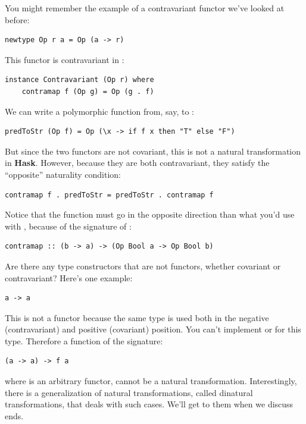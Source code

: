 You might remember the example of a contravariant functor we've looked
at before:

\begin{Verbatim}[commandchars=\\\{\}]
newtype Op r a = Op (a -> r)
\end{Verbatim}
This functor is contravariant in :

\begin{Verbatim}[commandchars=\\\{\}]
instance Contravariant (Op r) where
    contramap f (Op g) = Op (g . f)
\end{Verbatim}
We can write a polymorphic function from, say,  to
:

\begin{Verbatim}
predToStr (Op f) = Op (\x -> if f x then "T" else "F")
\end{Verbatim}
But since the two functors are not covariant, this is not a natural
transformation in \textbf{Hask}. However, because they are both
contravariant, they satisfy the ``opposite'' naturality condition:

\begin{Verbatim}[commandchars=\\\{\}]
contramap f . predToStr = predToStr . contramap f
\end{Verbatim}
Notice that the function  must go in the opposite direction
than what you'd use with , because of the signature of
:

\begin{Verbatim}[commandchars=\\\{\}]
contramap :: (b -> a) -> (Op Bool a -> Op Bool b)
\end{Verbatim}
Are there any type constructors that are not functors, whether covariant
or contravariant? Here's one example:

\begin{Verbatim}[commandchars=\\\{\}]
a -> a
\end{Verbatim}
This is not a functor because the same type  is used both in
the negative (contravariant) and positive (covariant) position. You
can't implement  or  for this type.
Therefore a function of the signature:

\begin{Verbatim}[commandchars=\\\{\}]
(a -> a) -> f a
\end{Verbatim}
where  is an arbitrary functor, cannot be a natural
transformation. Interestingly, there is a generalization of natural
transformations, called dinatural transformations, that deals with such
cases. We'll get to them when we discuss ends.

